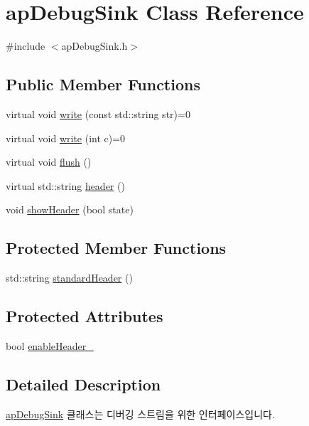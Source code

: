 \hypertarget{classapDebugSink}{
\section{apDebugSink Class Reference}
\label{classapDebugSink}
}


{\ttfamily \#include $<$apDebugSink.h$>$}

\subsection*{Public Member Functions}
\begin{DoxyCompactItemize}
\item 
virtual void \hyperlink{classapDebugSink_a6534c269975f6276f4754ba6316232ba}{write} (const std::string str)=0
\item 
virtual void \hyperlink{classapDebugSink_a3e367099f19e5edc7a125914653592d1}{write} (int c)=0
\item 
virtual void \hyperlink{classapDebugSink_a7d7ff2d4974665a43a996ab5d245de6b}{flush} ()
\item 
virtual std::string \hyperlink{classapDebugSink_aae1dd83c95adcdc4d7ede36ae5c79287}{header} ()
\item 
void \hyperlink{classapDebugSink_a5f4db9dc661bfb26196f0d08b8f58f39}{showHeader} (bool state)
\end{DoxyCompactItemize}
\subsection*{Protected Member Functions}
\begin{DoxyCompactItemize}
\item 
std::string \hyperlink{classapDebugSink_a0481b649618d6e167565ed0f7d36f27d}{standardHeader} ()
\end{DoxyCompactItemize}
\subsection*{Protected Attributes}
\begin{DoxyCompactItemize}
\item 
bool \hyperlink{classapDebugSink_a8629a797b6533d03aa7fdb81c124a64c}{enableHeader\_\-}
\end{DoxyCompactItemize}


\subsection{Detailed Description}
\hyperlink{classapDebugSink}{apDebugSink} 클래스는 디버깅 스트림을 위한 인터페이스입니다. 

